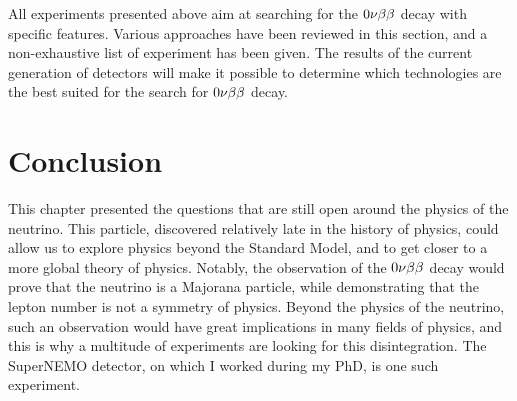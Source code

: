 All experiments presented above aim at searching for the $0\nu\beta\beta$ decay with specific features.
Various approaches have been reviewed in this section, and a non-exhaustive list of experiment has been given.
The results of the current generation of detectors will make it possible to determine which technologies are the best suited for the search for $0\nu\beta\beta$ decay.





\section{Conclusion}

This chapter presented the questions that are still open around the physics of the neutrino.
This particle, discovered relatively late in the history of physics, could allow us to explore physics beyond the Standard Model, and to get closer to a more global theory of physics.
Notably, the observation of the $0\nu\beta\beta$ decay would prove that the neutrino is a Majorana particle, while demonstrating that the lepton number is not a symmetry of physics.
Beyond the physics of the neutrino, such an observation would have great implications in many fields of physics, and this is why a multitude of experiments are looking for this disintegration.
The SuperNEMO detector, on which I worked during my PhD, is one such experiment.
